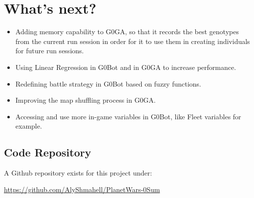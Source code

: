 \documentclass[12pt]{scrartcl}
\begin{document}
	\section*{What's next?}
	\begin{itemize}
		\item Adding memory capability to G0GA, so that it records the best genotypes from the current run session in order for it to use them in creating individuals for future run sessions.
		\item Using Linear Regression in G0Bot and in G0GA to increase performance.
		\item Redefining battle strategy in G0Bot based on fuzzy functions.
		\item Improving the map shuffling process in G0GA.
		\item Accessing and use more in-game variables in G0Bot, like Fleet variables for example.
	\end{itemize}
\begin{flushleft}
	\section*{\textbf{Code Repository}}
\end{flushleft}
\begin{flushleft}
	A Github repository exists for this project under:\\
\end{flushleft}
	\begin{center}
		\url{https://github.com/AlyShmahell/PlanetWars-0Sum}
	\end{center}
	\newpage
\end{document}
